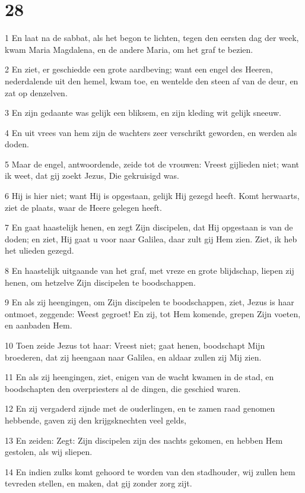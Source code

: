 \chapter{28}

\par 1 En laat na de sabbat, als het begon te lichten, tegen den eersten dag der week, kwam Maria Magdalena, en de andere Maria, om het graf te bezien.
\par 2 En ziet, er geschiedde een grote aardbeving; want een engel des Heeren, nederdalende uit den hemel, kwam toe, en wentelde den steen af van de deur, en zat op denzelven.
\par 3 En zijn gedaante was gelijk een bliksem, en zijn kleding wit gelijk sneeuw.
\par 4 En uit vrees van hem zijn de wachters zeer verschrikt geworden, en werden als doden.
\par 5 Maar de engel, antwoordende, zeide tot de vrouwen: Vreest gijlieden niet; want ik weet, dat gij zoekt Jezus, Die gekruisigd was.
\par 6 Hij is hier niet; want Hij is opgestaan, gelijk Hij gezegd heeft. Komt herwaarts, ziet de plaats, waar de Heere gelegen heeft.
\par 7 En gaat haastelijk henen, en zegt Zijn discipelen, dat Hij opgestaan is van de doden; en ziet, Hij gaat u voor naar Galilea, daar zult gij Hem zien. Ziet, ik heb het ulieden gezegd.
\par 8 En haastelijk uitgaande van het graf, met vreze en grote blijdschap, liepen zij henen, om hetzelve Zijn discipelen te boodschappen.
\par 9 En als zij heengingen, om Zijn discipelen te boodschappen, ziet, Jezus is haar ontmoet, zeggende: Weest gegroet! En zij, tot Hem komende, grepen Zijn voeten, en aanbaden Hem.
\par 10 Toen zeide Jezus tot haar: Vreest niet; gaat henen, boodschapt Mijn broederen, dat zij heengaan naar Galilea, en aldaar zullen zij Mij zien.
\par 11 En als zij heengingen, ziet, enigen van de wacht kwamen in de stad, en boodschapten den overpriesters al de dingen, die geschied waren.
\par 12 En zij vergaderd zijnde met de ouderlingen, en te zamen raad genomen hebbende, gaven zij den krijgsknechten veel gelds,
\par 13 En zeiden: Zegt: Zijn discipelen zijn des nachts gekomen, en hebben Hem gestolen, als wij sliepen.
\par 14 En indien zulks komt gehoord te worden van den stadhouder, wij zullen hem tevreden stellen, en maken, dat gij zonder zorg zijt.
